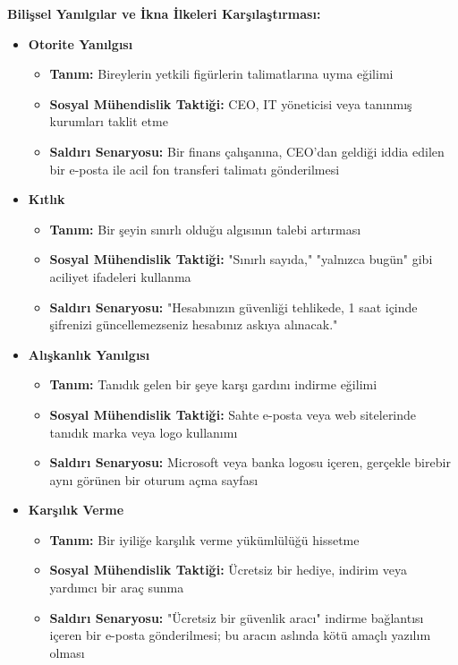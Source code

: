 \textbf{Bilişsel Yanılgılar ve İkna İlkeleri Karşılaştırması:}

\begin{itemize}
    \item \textbf{Otorite Yanılgısı}
    \begin{itemize}
        \item \textbf{Tanım:} Bireylerin yetkili figürlerin talimatlarına uyma eğilimi
        \item \textbf{Sosyal Mühendislik Taktiği:} CEO, IT yöneticisi veya tanınmış kurumları taklit etme
        \item \textbf{Saldırı Senaryosu:} Bir finans çalışanına, CEO'dan geldiği iddia edilen bir e-posta ile acil fon transferi talimatı gönderilmesi
    \end{itemize}
    
    \item \textbf{Kıtlık}
    \begin{itemize}
        \item \textbf{Tanım:} Bir şeyin sınırlı olduğu algısının talebi artırması
        \item \textbf{Sosyal Mühendislik Taktiği:} "Sınırlı sayıda," "yalnızca bugün" gibi aciliyet ifadeleri kullanma
        \item \textbf{Saldırı Senaryosu:} "Hesabınızın güvenliği tehlikede, 1 saat içinde şifrenizi güncellemezseniz hesabınız askıya alınacak."
    \end{itemize}
    
    \item \textbf{Alışkanlık Yanılgısı}
    \begin{itemize}
        \item \textbf{Tanım:} Tanıdık gelen bir şeye karşı gardını indirme eğilimi
        \item \textbf{Sosyal Mühendislik Taktiği:} Sahte e-posta veya web sitelerinde tanıdık marka veya logo kullanımı
        \item \textbf{Saldırı Senaryosu:} Microsoft veya banka logosu içeren, gerçekle birebir aynı görünen bir oturum açma sayfası
    \end{itemize}
    
    \item \textbf{Karşılık Verme}
    \begin{itemize}
        \item \textbf{Tanım:} Bir iyiliğe karşılık verme yükümlülüğü hissetme
        \item \textbf{Sosyal Mühendislik Taktiği:} Ücretsiz bir hediye, indirim veya yardımcı bir araç sunma
        \item \textbf{Saldırı Senaryosu:} "Ücretsiz bir güvenlik aracı" indirme bağlantısı içeren bir e-posta gönderilmesi; bu aracın aslında kötü amaçlı yazılım olması
    \end{itemize}
\end{itemize}

